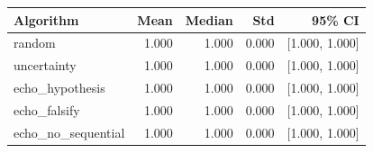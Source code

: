 \begin{tabular}{lrrrr}
\hline
Algorithm & Mean & Median & Std & 95\% CI \\
\hline
random & 1.000 & 1.000 & 0.000 & [1.000, 1.000] \\
uncertainty & 1.000 & 1.000 & 0.000 & [1.000, 1.000] \\
echo\_hypothesis & 1.000 & 1.000 & 0.000 & [1.000, 1.000] \\
echo\_falsify & 1.000 & 1.000 & 0.000 & [1.000, 1.000] \\
echo\_no\_sequential & 1.000 & 1.000 & 0.000 & [1.000, 1.000] \\
\hline
\end{tabular}
